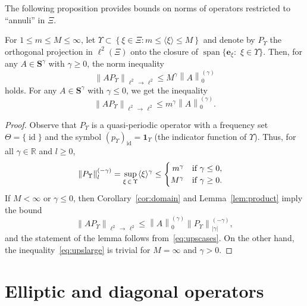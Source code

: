 \documentclass[10pt]{amsart}
\theoremstyle{definition}\newtheorem{defi}[theo]{Definition}\newtheorem{rema}[theo]{Remark}\newtheorem{exam}[theo]{Example}\newtheorem{nota}[theo]{Notation}
\DeclareMathOperator{\spann}{span}
\DeclareMathOperator{\id}{id}
\newcommand{\R}{\mathbb R}
\newcommand{\bone}{\boldsymbol 1}
\newcommand{\BS}{\mathbf S}
\newcommand{\be}{\mathbf e}
\renewcommand{\subseteq}{\subset}
\newcommand{\abs}[1]{\left\lvert #1 \right\rvert}
\newcommand{\set}[1]{\left\{ #1 \right\}}
\newcommand{\norm}[1]{\left\| #1 \right\|}
\newcommand{\snorm}[3]{\left\| #1\right\|_{#3}^{(#2)}}
\newcommand{\ang}[1]{\langle #1 \rangle}
\begin{document}
The following proposition provides bounds on norms of operators restricted to ``annuli'' in $\Xi$.

\begin{prop}\label{prop:normorder}
For $1 \le m \le M \le \infty$, let $\Upsilon \subseteq \set{\xi \in \Xi : m \le \ang \xi \le M}$ and denote by $P_{\Upsilon}$ the orthogonal projection in $\ell^2(\Xi)$ onto the closure of $\spann \{\be_\xi :$ \linebreak$\xi \in \Upsilon\}$. Then, for any $A \in \BS^\gamma$ with $\gamma \ge 0$, the norm inequality
\begin{equation}\label{eq:upslarge}
\norm{A P_\Upsilon}_{\ell^2\,\to\,\ell^2} \le M^\gamma\snorm{A}{\gamma}{0}
\end{equation}
holds. For any $A \in \BS^\gamma$ with $\gamma \le 0$, we get the inequality
\begin{equation}
\norm{A P_\Upsilon}_{\ell^2\,\to\,\ell^2} \le m^\gamma\snorm{A}{\gamma}{0}.
\end{equation}
\end{prop}
\begin{proof}
Observe that $P_\Upsilon$ is a quasi-periodic operator with a frequency set $\Theta=\{\id\}$ and the symbol $(p_\Upsilon)_{\id} =\bone_{\Upsilon}$ (the indicator function of $\Upsilon$). Thus, for all $\gamma\in\R$ and $l\geq0$,
\begin{equation}\label{eq:upscases}
\begin{aligned}
\snorm{P_\Upsilon}{-\gamma}{l} &= \sup_{\xi \,\in\,\Upsilon} \ang \xi^\gamma \leq
\begin{cases}
\hfill m^\gamma &\text{if } \gamma \le 0, \\
\hfill M^\gamma &\text{if } \gamma \ge 0.
\end{cases}
\end{aligned}
\end{equation}
If $M < \infty$ or $\gamma \le 0$, then Corollary~\ref{cor:domain} and Lemma~\ref{lem:product} imply the bound
\begin{equation}
\norm{A P_\Upsilon}_{\ell^2\,\to\,\ell^2} \le \snorm{A}{\gamma}{0} \snorm{P_\Upsilon}{-\gamma}{\abs{\gamma}},
\end{equation}
and the statement of the lemma follows from~\eqref{eq:upscases}. On the other hand, the inequality~\eqref{eq:upslarge} is trivial for $M = \infty$ and $\gamma > 0$.
\end{proof}


\section{Elliptic and diagonal operators}\label{sec:perturbation}
\end{document}
